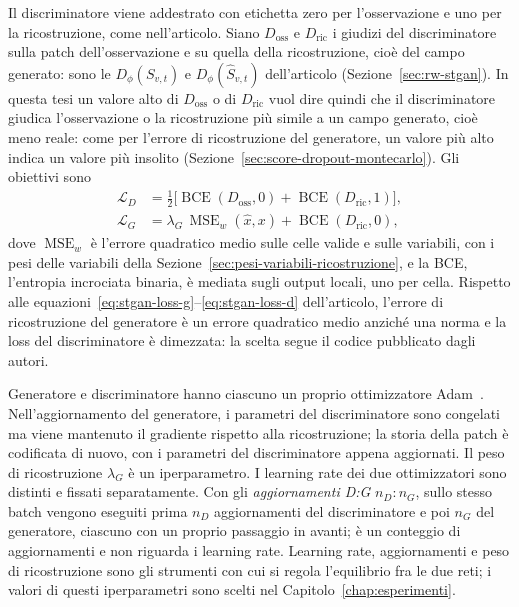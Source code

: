 Il discriminatore viene addestrato con etichetta zero per l'osservazione e uno per la ricostruzione, come nell'articolo. Siano $D_{\mathrm{oss}}$ e $D_{\mathrm{ric}}$ i giudizi del discriminatore sulla patch dell'osservazione e su quella della ricostruzione, cioè del campo generato: sono le $D_\phi(S_{v,t})$ e $D_\phi(\hat{S}_{v,t})$ dell'articolo (Sezione~\ref{sec:rw-stgan}). In questa tesi un valore alto di $D_{\mathrm{oss}}$ o di $D_{\mathrm{ric}}$ vuol dire quindi che il discriminatore giudica l'osservazione o la ricostruzione più simile a un campo generato, cioè meno reale: come per l'errore di ricostruzione del generatore, un valore più alto indica un valore più insolito (Sezione~\ref{sec:score-dropout-montecarlo}). Gli obiettivi sono
\begin{align}
\mathcal{L}_{D} &=
\tfrac{1}{2}\bigl[
\operatorname{BCE}(D_{\mathrm{oss}},0)
+\operatorname{BCE}(D_{\mathrm{ric}},1)\bigr],\\
\mathcal{L}_{G} &=
\lambda_G\,\operatorname{MSE}_w(\hat{x},x)
+\operatorname{BCE}(D_{\mathrm{ric}},0),
\end{align}
dove $\operatorname{MSE}_w$ è l'errore quadratico medio sulle celle valide e sulle variabili, con i pesi delle variabili della Sezione~\ref{sec:pesi-variabili-ricostruzione}, e la BCE, l'entropia incrociata binaria, è mediata sugli output locali, uno per cella. Rispetto alle equazioni~\eqref{eq:stgan-loss-g}--\eqref{eq:stgan-loss-d} dell'articolo, l'errore di ricostruzione del generatore è un errore quadratico medio anziché una norma e la loss del discriminatore è dimezzata: la scelta segue il codice pubblicato dagli autori.

Generatore e discriminatore hanno ciascuno un proprio ottimizzatore Adam~\cite{kingma2015adam}. Nell'aggiornamento del generatore, i parametri del discriminatore sono congelati ma viene mantenuto il gradiente rispetto alla ricostruzione; la storia della patch è codificata di nuovo, con i parametri del discriminatore appena aggiornati. Il peso di ricostruzione $\lambda_G$ è un iperparametro. I learning rate dei due ottimizzatori sono distinti e fissati separatamente. Con gli \emph{aggiornamenti D:G} $n_D{:}n_G$, sullo stesso batch vengono eseguiti prima $n_D$ aggiornamenti del discriminatore e poi $n_G$ del generatore, ciascuno con un proprio passaggio in avanti; è un conteggio di aggiornamenti e non riguarda i learning rate. Learning rate, aggiornamenti e peso di ricostruzione sono gli strumenti con cui si regola l'equilibrio fra le due reti; i valori di questi iperparametri sono scelti nel Capitolo~\ref{chap:esperimenti}.

